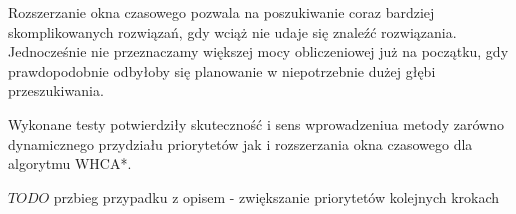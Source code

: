 Rozszerzanie okna czasowego pozwala na poszukiwanie coraz bardziej skomplikowanych rozwiązań, gdy wciąż nie udaje się znaleźć rozwiązania. Jednocześnie nie przeznaczamy większej mocy obliczeniowej już na początku, gdy prawdopodobnie odbyłoby się planowanie w niepotrzebnie dużej głębi przeszukiwania.

Wykonane testy potwierdziły skuteczność i sens wprowadzeniua metody zarówno dynamicznego przydziału priorytetów jak i rozszerzania okna czasowego dla algorytmu WHCA*.

$TODO$
przbieg przypadku z opisem - zwiększanie priorytetów kolejnych krokach